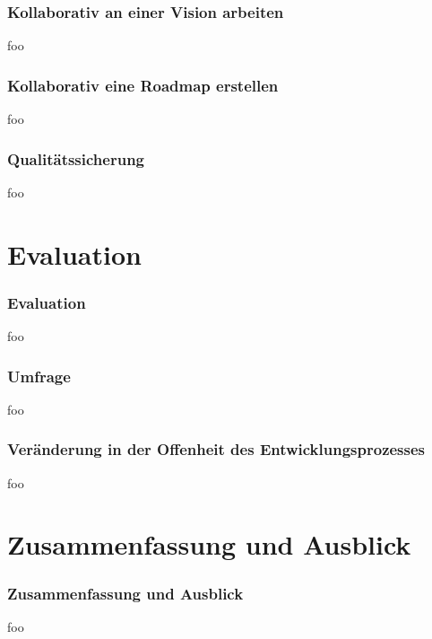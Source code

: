 \documentclass{beamer}
\begin{document}
\begin{frame}
\frametitle{Kollaborativ an einer Vision arbeiten}
foo
\end{frame}

\begin{frame}
\frametitle{Kollaborativ eine Roadmap erstellen}
foo
\end{frame}

\begin{frame}
\frametitle{Qualit\"atssicherung}
foo
\end{frame}

\section{Evaluation}

\begin{frame}
\frametitle{Evaluation}
foo
\end{frame}

\begin{frame}
\frametitle{Umfrage}
foo
\end{frame}

\begin{frame}
\frametitle{Ver\"anderung in der Offenheit des Entwicklungsprozesses}
foo
\end{frame}

\section{Zusammenfassung und Ausblick}

\begin{frame}
\frametitle{Zusammenfassung und Ausblick}
foo
\end{frame}
\end{document}
